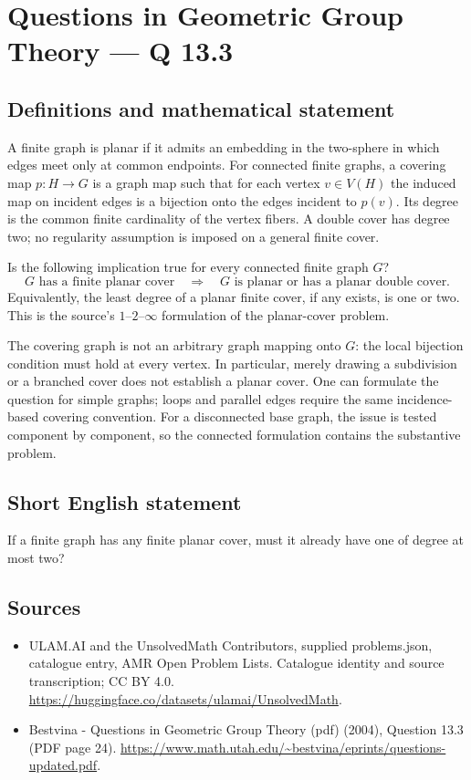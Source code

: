 \documentclass[11pt,a4paper]{article}
\begin{document}
\section*{Questions in Geometric Group Theory — Q 13.3}\label{statement}

\subsection{Definitions and mathematical statement}
A finite graph is planar if it admits an embedding in the two-sphere in which edges meet only at common endpoints. For connected finite graphs, a covering map $p:H\to G$ is a graph map such that for each vertex $v\in V(H)$ the induced map on incident edges is a bijection onto the edges incident to $p(v)$. Its degree is the common finite cardinality of the vertex fibers. A double cover has degree two; no regularity assumption is imposed on a general finite cover.

Is the following implication true for every connected finite graph $G$?
\[
 \text{$G$ has a finite planar cover}
 \quad\Longrightarrow\quad
 \text{$G$ is planar or has a planar double cover.}
\]
Equivalently, the least degree of a planar finite cover, if any exists, is one or two. This is the source's $1$--$2$--$\infty$ formulation of the planar-cover problem.

The covering graph is not an arbitrary graph mapping onto $G$: the local bijection condition must hold at every vertex. In particular, merely drawing a subdivision or a branched cover does not establish a planar cover. One can formulate the question for simple graphs; loops and parallel edges require the same incidence-based covering convention. For a disconnected base graph, the issue is tested component by component, so the connected formulation contains the substantive problem.
\subsection{Short English statement}
If a finite graph has any finite planar cover, must it already have one of degree at most two?
\subsection{Sources}
\begin{itemize}
\item[S1] ULAM.AI and the UnsolvedMath Contributors, supplied problems.json, catalogue entry, AMR Open Problem Lists. Catalogue identity and source transcription; CC BY 4.0.
\url{https://huggingface.co/datasets/ulamai/UnsolvedMath}.
\item[S2] Bestvina - Questions in Geometric Group Theory (pdf) (2004), Question 13.3 (PDF page 24). 
\url{https://www.math.utah.edu/~bestvina/eprints/questions-updated.pdf}.
\end{itemize}
\end{document}

